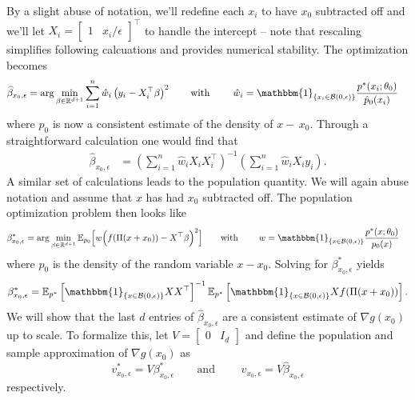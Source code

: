 \documentclass[11pt]{article}
\begin{document}
\noindent By a slight abuse of notation, we'll redefine each $x_i$ to have $x_0$ subtracted off and we'll let $X_i = \begin{bmatrix}
    1 & x_i/\epsilon
\end{bmatrix}^{\top}$ to handle the intercept -- note that rescaling simplifies following calcuations and provides numerical stability. The optimization becomes 
\begin{align} 
\widehat{\beta}_{x_0,\epsilon} &= \arg\min_{\beta \in \mathbb{R}^{d+1}} \sum_{i = 1}^{n}\hat{w}_i\left(y_i - X_i^{\top}\beta\right)^2 \qquad \text{with }\qquad \hat{w}_i = \mathbbm{1}_{\{x_i \in \mathcal{B}(0, \epsilon)\}}\frac{p^*(x_i;\theta_0)}{\hat{p}_0(x_i)}
\end{align}
where $\hat{p}_0$ is now a consistent estimate of the density of $x - \,x_0$. Through a straightforward calculation one would find that
\begin{align}
    \widehat{\beta}_{x_0,\epsilon} &= \left(\sum_{i = 1}^n\hat{w}_iX_iX_i^{\top}\right)^{-1}\left(\sum_{i = 1}^n\hat{w}_iX_iy_i\right). \label{eq: sample est closed form}
\end{align}
A similar set of calculations leads to the population quantity. We will again abuse notation and assume that $x$ has had $x_0$ subtracted off. The population optimization problem then looks like
\begin{align}
\beta^*_{x_0, \epsilon} &= \arg\min_{\beta \in \mathbb{R}^{d+1}} \mathbb{E}_{p_0} \Big[w\Big(f(\Pi(x + x_0)) - X^{\top}\beta \Big)^2\Big] \qquad \text{with }\qquad w = \mathbbm{1}_{\{x \in \mathcal{B}(0, \epsilon)\}}\frac{p^*(x;\theta_0)}{p_0(x)}\label{eq: population estimator}
\end{align}
where $p_0$ is the density of the random variable $x - x_0$. Solving for $\beta^*_{x_0, \epsilon}$ yields
\begin{align}
    \beta^*_{x_0, \epsilon} = \mathbb{E}_{p^*}\left[\mathbbm{1}_{\{x \in \mathcal{B}(0,\epsilon)\}}XX^{\top}\right]^{-1}\mathbb{E}_{p^*}\left[\mathbbm{1}_{\{x \in \mathcal{B}(0,\epsilon)\}}Xf(\Pi(x+x_0))\right]. \label{eq: population estimator closed form}
\end{align}
We will show that the last $d$ entries of $\widehat{\beta}_{x_0,\epsilon}$ are a consistent estimate of $\nabla g(x_0)$ up to scale. To formalize this, let $V = \begin{bmatrix} 0 & I_d\end{bmatrix}$ and define the population and sample approximation of $\nabla g(x_0)$ as
\begin{equation}
    v^*_{x_0, \epsilon} = V\beta^*_{x_0, \epsilon} \qquad \text{and }\qquad \hat{v}_{x_0, \epsilon} = V\hat{\beta}_{x_0, \epsilon} \label{eq: velocity estimator}
\end{equation}
respectively.
\end{document}
